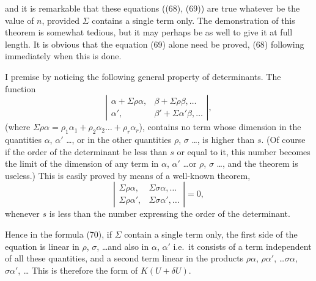 \documentclass[11pt,a4paper]{article}
\theoremstyle{plain}
\theoremstyle{definition}
\theoremstyle{remark}
\begin{document}
and it is remarkable that these equations ((68), (69)) are true whatever be the value
of $n$, provided $\Sigma$ contains a single term only. The demonstration of this theorem is
somewhat tedious, but it may perhaps be as well to give it at full length. It is
obvious that the equation (69) alone need be proved, (68) following immediately when
this is done.

I premise by noticing the following general property of determinants. The function
\[
\left|\begin{array}{cc}
\alpha + \Sigma\rho\alpha, & \beta + \Sigma\rho\beta, \ldots \\
\alpha', & \beta' + \Sigma\alpha'\beta, \ldots
\end{array}\right|
\tag{70},
\]
(where $\Sigma\rho\alpha = \rho_1\alpha_1 + \rho_2\alpha_2 \ldots + \rho_r\alpha_r$), contains no term whose dimension in the quantities
$\alpha$, $\alpha'$ \ldots, or in the other quantities $\rho$, $\sigma$ \ldots, is higher than $s$. (Of course if the order
of the determinant be less than $s$ or equal to it, this number becomes the limit of
the dimension of any term in $\alpha$, $\alpha'$ \ldots or $\rho$, $\sigma$ \ldots, and the theorem is useless.) This
is easily proved by means of a well-known theorem,
\[
\left|\begin{array}{cc}
\Sigma\rho\alpha, & \Sigma\sigma\alpha, \ldots \\
\Sigma\rho\alpha', & \Sigma\sigma\alpha', \ldots
\end{array}\right| = 0 \tag{71},
\]
whenever $s$ is less than the number expressing the order of the determinant.

\newpage
Hence in the formula (70), if $\Sigma$ contain a single term only, the first side of the equation
is linear in $\rho$, $\sigma$, \ldots and also in $\alpha$, $\alpha'$ i.e.\ it consists of a term independent of
all these quantities, and a second term linear in the products $\rho\alpha$, $\rho\alpha'$, \ldots $\sigma\alpha$, $\sigma\alpha'$, \ldots
This is therefore the form of $K(U+\delta U)$.
\end{document}
